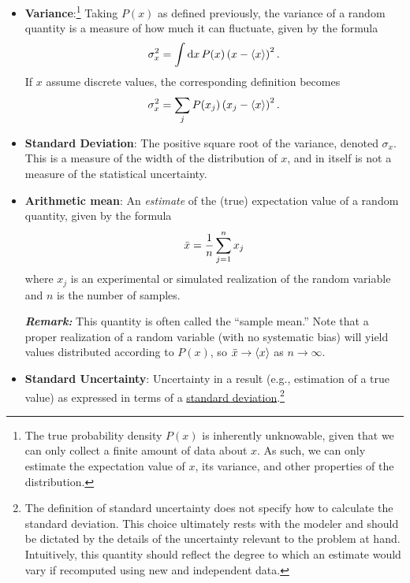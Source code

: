 \begin{itemize}
\item {\bf Variance}:\footnote{The true probability density $P(x)$ is inherently unknowable, given that we can only collect a finite amount of data about $x$.  As such, we can only estimate the expectation value of $x$, its variance, and other properties of the distribution.} Taking $P(x)$ as defined previously, the variance of a random quantity is a measure of how much it can fluctuate, given by the formula
\begin{align}
\sigma_x^2 = \int {\rm d}x\, P(x) \left( x  - \langle x \rangle \right)^2.
\end{align}
If $x$ assume discrete values, the corresponding definition becomes
\begin{align}
\sigma_x^2 = \sum_j P(x_j) \left( x_j  - \langle x \rangle \right)^2.
\end{align}

\item {\bf Standard Deviation}: The positive square root of the variance, denoted $\sigma_x$.\label{def:st_dev}  This is a measure of the width of the distribution of $x$, and in itself is not a measure of the statistical uncertainty.

\item {\bf Arithmetic mean}: An \emph{estimate} of the (true) expectation value of a random quantity, given by the formula
  \begin{equation}
    \bar{x} = \dfrac{1}{n} \sum_{j=1}^{n} x_j \label{def:arith_mean}
  \end{equation}
  where $x_j$ is an experimental or simulated realization of the random variable and $n$ is the number of samples.
\smallskip

\textbf{\textit{Remark:}} This quantity is often called the ``sample mean.''
Note that a proper realization of a random variable (with no systematic bias) will yield values distributed according to $P(x)$, so $\bar{x} \rightarrow \langle x \rangle$ as $n \rightarrow \infty$.


\item {\bf Standard Uncertainty}: Uncertainty in a result (e.g., estimation of a true value) as expressed in terms of a \hyperref[def:st_dev]{standard deviation}.\footnote{The definition of standard uncertainty does not specify how to calculate the standard deviation. This choice ultimately rests with the modeler and should be dictated by the details of the uncertainty relevant to the problem at hand.  Intuitively, this quantity should reflect the degree to which an estimate would vary if recomputed using new and independent data.}
  \label{def:std_unc}


\end{itemize}
